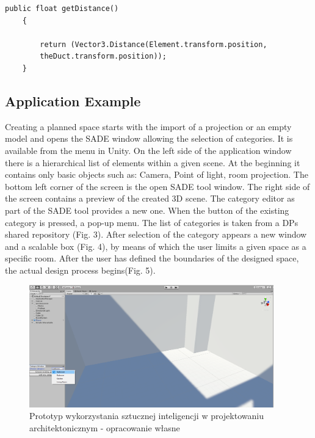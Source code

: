 \documentclass[runningheads]{llncs}
\begin{document}
\begin{lstlisting}[language={[Sharp]C}, caption={C\# exaple}, label={Script}]
public float getDistance()
    {

        return (Vector3.Distance(Element.transform.position, 
        theDuct.transform.position));
    }
\end{lstlisting}

\subsection{Application Example}
Creating a planned space starts with the import of a projection or an empty model and opens the SADE window allowing the selection of categories. It is available from the menu in Unity. On the left side of the application window there is a hierarchical list of elements within a given scene. At the beginning it contains only basic objects such as: Camera, Point of light, room projection. The bottom left corner of the screen is the open SADE tool window. The right side of the screen contains a preview of the created 3D scene. The category editor as part of the SADE tool provides a new one. When the button of the existing category is pressed, a pop-up menu. The list of categories is taken from a DPs shared repository (Fig. 3). After selection of the category appears a new window and a scalable box (Fig. 4), by means of which the user limits a given space as a specific room. After the user has defined the boundaries of the designed space, the actual design process begins(Fig. 5).

\begin{figure}[H]
\centering
\includegraphics[width=\textwidth, height=5.3cm]{editor1.png}
\caption{Prototyp wykorzystania sztucznej inteligencji w projektowaniu architektonicznym - opracowanie własne} \label{fig3}
\end{figure}
\end{document}
